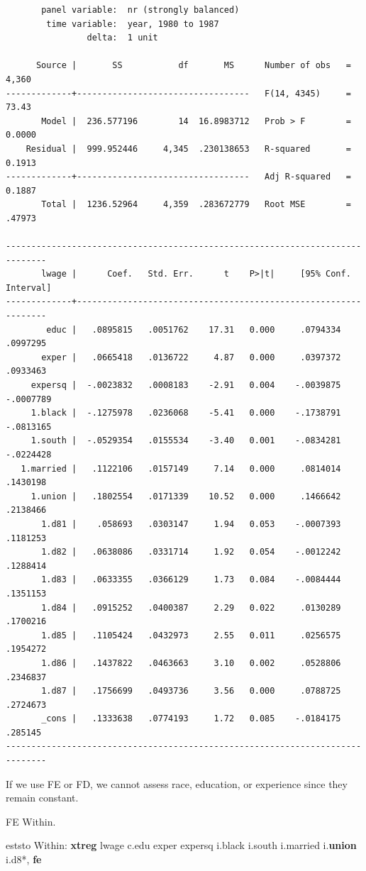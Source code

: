 \documentclass[
]{book}
\newenvironment{Shaded}{\begin{snugshade}}{\end{snugshade}}
\newcommand{\BaseNTok}[1]{\textcolor[rgb]{0.00,0.00,0.81}{#1}}
\newcommand{\KeywordTok}[1]{\textcolor[rgb]{0.13,0.29,0.53}{\textbf{#1}}}
\newcommand{\NormalTok}[1]{#1}
\begin{document}
\begin{verbatim}
       panel variable:  nr (strongly balanced)
        time variable:  year, 1980 to 1987
                delta:  1 unit

      Source |       SS           df       MS      Number of obs   =     4,360
-------------+----------------------------------   F(14, 4345)     =     73.43
       Model |  236.577196        14  16.8983712   Prob > F        =    0.0000
    Residual |  999.952446     4,345  .230138653   R-squared       =    0.1913
-------------+----------------------------------   Adj R-squared   =    0.1887
       Total |  1236.52964     4,359  .283672779   Root MSE        =    .47973

------------------------------------------------------------------------------
       lwage |      Coef.   Std. Err.      t    P>|t|     [95% Conf. Interval]
-------------+----------------------------------------------------------------
        educ |   .0895815   .0051762    17.31   0.000     .0794334    .0997295
       exper |   .0665418   .0136722     4.87   0.000     .0397372    .0933463
     expersq |  -.0023832   .0008183    -2.91   0.004    -.0039875   -.0007789
     1.black |  -.1275978   .0236068    -5.41   0.000    -.1738791   -.0813165
     1.south |  -.0529354   .0155534    -3.40   0.001    -.0834281   -.0224428
   1.married |   .1122106   .0157149     7.14   0.000     .0814014    .1430198
     1.union |   .1802554   .0171339    10.52   0.000     .1466642    .2138466
       1.d81 |    .058693   .0303147     1.94   0.053    -.0007393    .1181253
       1.d82 |   .0638086   .0331714     1.92   0.054    -.0012242    .1288414
       1.d83 |   .0633355   .0366129     1.73   0.084    -.0084444    .1351153
       1.d84 |   .0915252   .0400387     2.29   0.022     .0130289    .1700216
       1.d85 |   .1105424   .0432973     2.55   0.011     .0256575    .1954272
       1.d86 |   .1437822   .0463663     3.10   0.002     .0528806    .2346837
       1.d87 |   .1756699   .0493736     3.56   0.000     .0788725    .2724673
       _cons |   .1333638   .0774193     1.72   0.085    -.0184175     .285145
------------------------------------------------------------------------------
\end{verbatim}

If we use FE or FD, we cannot assess race, education, or experience since they remain constant.

FE Within.

\begin{Shaded}
\begin{Highlighting}[]
\NormalTok{eststo Within: }\KeywordTok{xtreg}\NormalTok{ lwage c.edu exper expersq i.}\BaseNTok{black}\NormalTok{ i.south i.married i.}\KeywordTok{union}\NormalTok{ i.d8*, }\KeywordTok{fe}
\end{Highlighting}
\end{Shaded}
\end{document}
